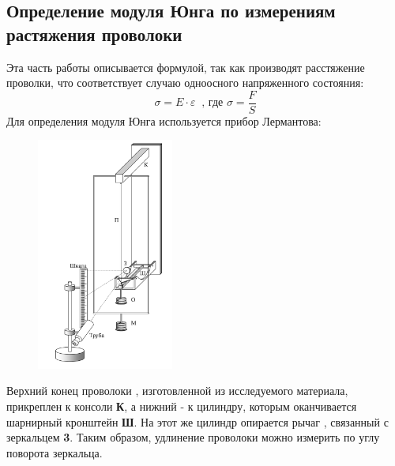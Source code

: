 \documentclass[a4paper,12pt]{article} %
\begin{document}
\subsection{Определение модуля Юнга по измерениям растяжения проволоки}

Эта часть работы описывается формулой, так как производят расстяжение проволки, что соответствует случаю одноосного напряженного состояния:
\[
    \sigma = E \cdot \varepsilon~\text{ , где } \sigma = \frac{F}{S}
\]
Для определения модуля Юнга используется прибор Лермантова:

\begin{figure}[H]
    \centering
    \includegraphics[width=0.4\textwidth]{images/1.png}
\end{figure}

Верхний конец проволоки , изготовленной из исследуемого материала, прикреплен к консоли \textbf{К}, а нижний - к цилиндру, которым оканчивается шарнирный кронштейн \textbf{Ш}. На этот же цилиндр опирается рычаг , связанный с зеркальцем \textbf{3}. Таким образом, удлинение проволоки можно измерить по углу поворота зеркальца.
\end{document}
